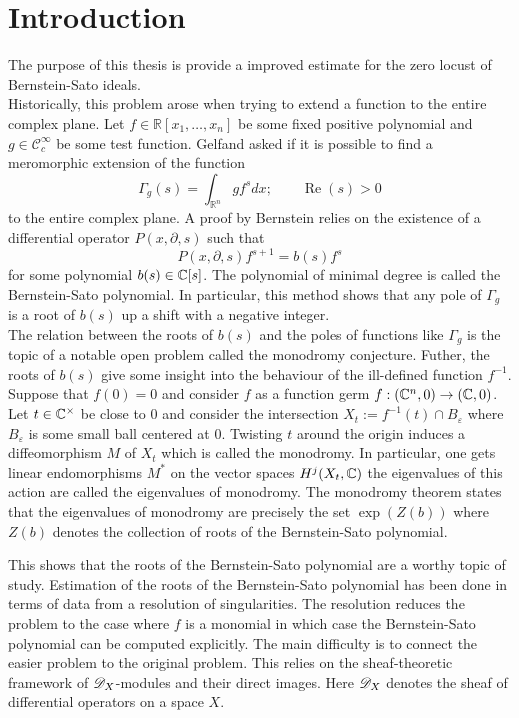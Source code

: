 \chapter*{Introduction} %



The purpose of this thesis is provide a improved estimate for the zero locust of Bernstein-Sato ideals.\\

Historically, this problem arose when trying to extend a function to the entire complex plane.
Let $f\in \mathbb{R}[x_1,\ldots,x_n]$ be some fixed positive polynomial and $g \in \mathcal{C}_c^\infty$ be some test function.
Gelfand asked if it is possible to find a meromorphic extension of the function
$$\Gamma_g(s) = \int_{\mathbb{R}^n} g f^s dx; \qquad \operatorname{Re}(s)>0 $$
to the entire complex plane.
A proof by Bernstein relies on the existence of a differential operator $P(x,\partial, s)$ such that
$$P(x,\partial,s) f^{s+1} = b(s) f^s$$
for some polynomial $b(s)\in \mathbb{C}[s]$.
The polynomial of minimal degree is called the Bernstein-Sato polynomial.
In particular, this method shows that any pole of $\Gamma_g$ is a root of $b(s)$ up a shift with a negative integer.\\

The relation between the roots of $b(s)$ and the poles of functions like $\Gamma_g$ is the topic of a notable open problem called the monodromy conjecture.
Futher, the roots of $b(s)$ give some insight into the behaviour of the ill-defined function $f^{-1}$.
Suppose that $f(0)= 0$ and consider $f$ as a function germ $f:(\mathbb{C}^n,0)\to (\mathbb{C},0)$.
Let $t\in \mathbb{C}^\times$ be close to $0$ and consider the intersection $X_t := f^{-1}(t)\cap B_\varepsilon$ where $B_\varepsilon$ is some small ball centered at $0$.
Twisting $t$ around the origin induces a diffeomorphism $M$ of $X_t$ which is called the monodromy.
In particular, one gets linear endomorphisms $M^*$ on the vector spaces $H^j(X_t,\mathbb{C})$ the eigenvalues of this action are called the eigenvalues of monodromy.
The monodromy theorem states that the eigenvalues of monodromy are precisely the set $\exp(Z(b))$ where $Z(b)$ denotes the collection of roots of the Bernstein-Sato polynomial.

This shows that the roots of the Bernstein-Sato polynomial are a worthy topic of study.
Estimation of the roots of the Bernstein-Sato polynomial has been done in terms of data from a resolution of singularities.
The resolution reduces the problem to the case where $f$ is a monomial in which case the Bernstein-Sato polynomial can be computed explicitly.
The main difficulty is to connect the easier problem to the original problem.
This relies on the sheaf-theoretic framework of $\mathscr{D}_X$-modules and their direct images.
Here $\mathscr{D}_X$ denotes the sheaf of differential operators on a space $X$.

